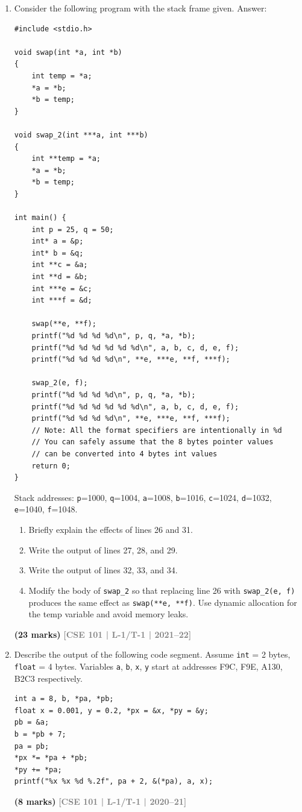 \documentclass[12pt,a3paper]{article}
\newcommand{\yr}[1]{\hfill\textcolor{gray}{\small\textbf{[#1]}}}
\newcommand{\mk}[1]{\textcolor{orange!70!black}{\small\textbf{(#1 marks)}}}
\begin{document}
\begin{enumerate}
\item Consider the following program with the stack frame given. Answer:
\begin{lstlisting}
#include <stdio.h>

void swap(int *a, int *b)
{
    int temp = *a;
    *a = *b;
    *b = temp;
}

void swap_2(int ***a, int ***b)
{
    int **temp = *a;
    *a = *b;
    *b = temp;
}

int main() {
    int p = 25, q = 50;
    int* a = &p;
    int* b = &q;
    int **c = &a;
    int **d = &b;
    int ***e = &c;
    int ***f = &d;

    swap(**e, **f);
    printf("%d %d %d %d\n", p, q, *a, *b);
    printf("%d %d %d %d %d %d\n", a, b, c, d, e, f);
    printf("%d %d %d %d\n", **e, ***e, **f, ***f);

    swap_2(e, f);
    printf("%d %d %d %d\n", p, q, *a, *b);
    printf("%d %d %d %d %d %d\n", a, b, c, d, e, f);
    printf("%d %d %d %d\n", **e, ***e, **f, ***f);
    // Note: All the format specifiers are intentionally in %d
    // You can safely assume that the 8 bytes pointer values 
    // can be converted into 4 bytes int values
    return 0;
}
\end{lstlisting}
Stack addresses: \texttt{p}=1000, \texttt{q}=1004, \texttt{a}=1008, \texttt{b}=1016, \texttt{c}=1024, \texttt{d}=1032, \texttt{e}=1040, \texttt{f}=1048.
\begin{enumerate}
  \item Briefly explain the effects of lines 26 and 31.
  \item Write the output of lines 27, 28, and 29.
  \item Write the output of lines 32, 33, and 34.
  \item Modify the body of \texttt{swap\_2} so that replacing line 26 with \texttt{swap\_2(e, f)} produces the same effect as \texttt{swap(**e, **f)}. Use dynamic allocation for the temp variable and avoid memory leaks.
\end{enumerate}
\mk{23} \yr{CSE 101 | L-1/T-1 | 2021--22}

\item Describe the output of the following code segment. Assume \texttt{int} = 2 bytes, \texttt{float} = 4 bytes. Variables \texttt{a}, \texttt{b}, \texttt{x}, \texttt{y} start at addresses F9C, F9E, A130, B2C3 respectively.
 
\begin{lstlisting}
int a = 8, b, *pa, *pb;
float x = 0.001, y = 0.2, *px = &x, *py = &y;
pb = &a;
b = *pb + 7;
pa = pb;
*px *= *pa + *pb;
*py += *pa;
printf("%x %x %d %.2f", pa + 2, &(*pa), a, x);
\end{lstlisting}
\mk{8} \yr{CSE 101 | L-1/T-1 | 2020--21}


\end{enumerate}
\end{document}
